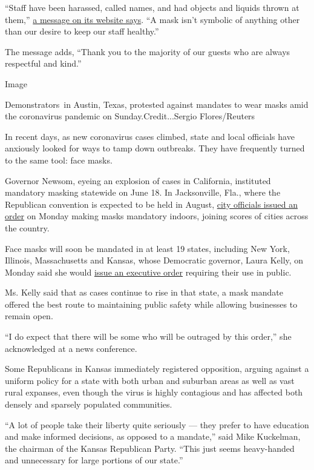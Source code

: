 ``Staff have been harassed, called names, and had objects and liquids
thrown at them,'' \href{https://www.hugostacos.com/}{a message on its
website says}. ``A mask isn't symbolic of anything other than our desire
to keep our staff healthy.''

The message adds, ``Thank you to the majority of our guests who are
always respectful and kind.''

Image

Demonstrators~in Austin, Texas, protested against mandates to wear masks
amid the coronavirus pandemic on Sunday.Credit...Sergio Flores/Reuters

In recent days, as new coronavirus cases climbed, state and local
officials have anxiously looked for ways to tamp down outbreaks. They
have frequently turned to the same tool: face masks.

Governor Newsom, eyeing an explosion of cases in California, instituted
mandatory masking statewide on June 18. In Jacksonville, Fla., where the
Republican convention is expected to be held in August,
\href{https://www.nytimes.com/2020/06/29/us/politics/rnc-masks-convention.html}{city
officials issued an order} on Monday making masks mandatory indoors,
joining scores of cities across the country.

Face masks will soon be mandated in at least 19 states, including New
York, Illinois, Massachusetts and Kansas, whose Democratic governor,
Laura Kelly, on Monday said she would
\href{https://governor.kansas.gov/governor-laura-kelly-announces-masks-must-be-worn-statewide/}{issue
an executive order} requiring their use in public.

Ms. Kelly said that as cases continue to rise in that state, a mask
mandate offered the best route to maintaining public safety while
allowing businesses to remain open.

``I do expect that there will be some who will be outraged by this
order,'' she acknowledged at a news conference.

Some Republicans in Kansas immediately registered opposition, arguing
against a uniform policy for a state with both urban and suburban areas
as well as vast rural expanses, even though the virus is highly
contagious and has affected both densely and sparsely populated
communities.

``A lot of people take their liberty quite seriously --- they prefer to
have education and make informed decisions, as opposed to a mandate,''
said Mike Kuckelman, the chairman of the Kansas Republican Party. ``This
just seems heavy-handed and unnecessary for large portions of our
state.''

